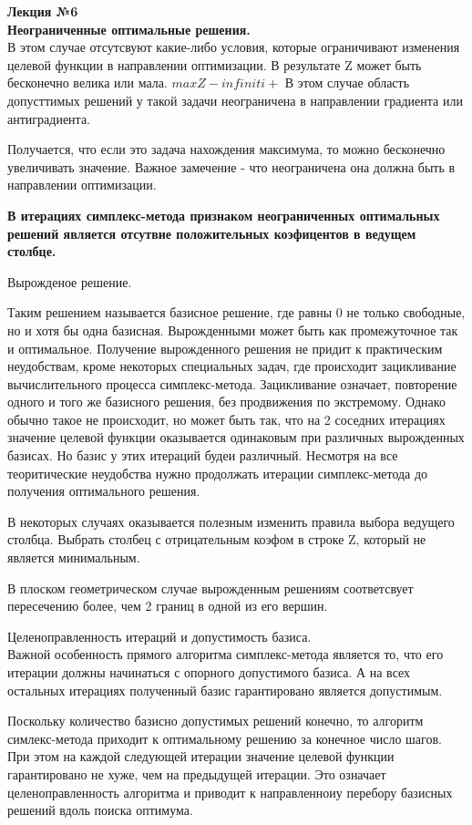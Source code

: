 \LARGE{ \textbf {Лекция №6}}\\
\Large{ \textbf {Неограниченные оптимальные решения.}}\\

В этом случае отсутсвуют какие-либо условия, которые ограничивают изменения целевой функции в направлении оптимизации.
В результате Z может быть бесконечно велика или мала.
$ max Z - infiniti + $
В этом случае область допусттимых решений у такой задачи неограничена в направлении градиента или антиградиента.

Получается, что если это задача нахождения максимума, то можно бесконечно увеличивать значение.
Важное замечение - что неограничена она должна быть в направлении оптимизации.

\textbf {В итерациях симплекс-метода признаком неограниченных оптимальных решений является отсутвие положительных коэфицентов в ведущем столбце.}

Вырожденое решение.

Таким решением называется базисное решение, где равны 0 не только свободные, но и хотя бы одна базисная.
Вырожденными может быть как промежуточное так и оптимальное.
Получение вырожденного решения не придит к практическим неудобствам, кроме некоторых специальных задач,
где происходит зацикливание вычислительного процесса симплекс-метода.
Зацикливание означает, повторение одного и того же базисного решения, без продвижения по экстремому.
Однако обычно такое не происходит, но может быть так,
что на 2 соседних итерациях значение целевой функции оказывается одинаковым при различных вырожденных базисах.
Но базис у этих итераций будеи различный.
Несмотря на все теоритические неудобства нужно продолжать итерации симплекс-метода до получения оптимального решения.

В некоторых случаях оказывается полезным изменить правила выбора ведущего столбца.
Выбрать столбец с отрицательным коэфом в строке Z, который не является минимальным.

В плоском геометрическом случае вырожденным решениям соответсвует пересечению более, чем 2 границ в одной из его вершин.

Целеноправленность итераций и допустимость базиса.\\
Важной особенность прямого алгоритма симплекс-метода является то, что его итерации должны начинаться с опорного допустимого базиса.
А на всех остальных итерациях полученный базис гарантировано является допустимым.

Поскольку количество базисно допустимых решений конечно, то алгоритм симлекс-метода приходит к оптимальному решению за конечное число шагов.
При этом на каждой следующей итерации значение целевой функции гарантировано не хуже, чем на предыдущей итерации.
Это означает целеноправленность алгоритма и приводит к направленноиу перебору базисных решений вдоль поиска оптимума.


